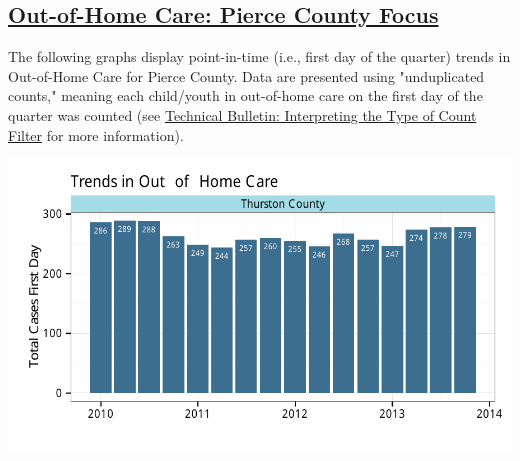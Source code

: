 \documentclass{article}\usepackage{graphicx, color}
\makeatletter
\def\maxwidth{ %
  \ifdim\Gin@nat@width>\linewidth
    \linewidth
  \else
    \Gin@nat@width
  \fi
}
\newenvironment{knitrout}{}{} %
\makeatother
\begin{document}
\subsection{\href{http://www.partnersforourchildren.org/child-well-being/visualizations/out-home-care/trends}
 {Out-of-Home Care: Pierce County Focus}
}
The following graphs display point-in-time (i.e., first day of the quarter) trends in  Out-of-Home Care for
Pierce County. Data are presented using "unduplicated counts," meaning each child/youth in out-of-home care on the first day of the quarter was counted (see \href{http://http://www.partnersforourchildren.org/publications/using-different-count-types-data-portal}{Technical Bulletin: Interpreting the Type of Count Filter} for more information). 
\nopagebreak[3]
\begin{knitrout}
\color{fgcolor}

{\centering \includegraphics[width=\maxwidth]{figure/ooh_focus} 

}



\end{knitrout}
\end{document}
